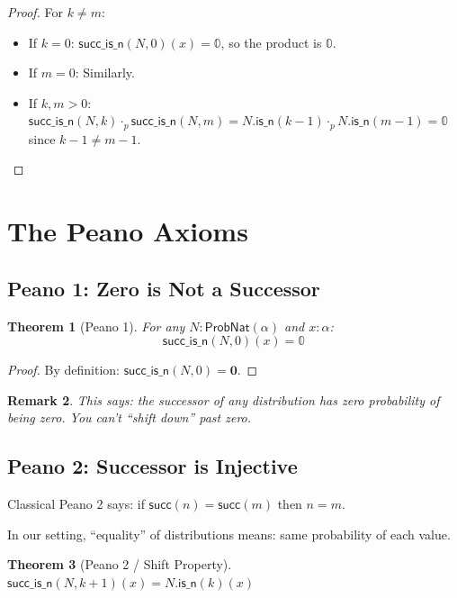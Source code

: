 \documentclass[11pt,a4paper]{article}
\newtheorem{theorem}{Theorem}[section]
\newtheorem{remark}[theorem]{Remark}
\newcommand{\ProbNat}{\mathsf{ProbNat}}
\newcommand{\pzero}{\mathbb{0}}
\newcommand{\pmul}{\cdot_p}
\begin{document}
\begin{proof}
For $k \neq m$:
\begin{itemize}
    \item If $k = 0$: $\mathsf{succ\_is\_n}(N, 0)(x) = \pzero$, so the product is $\pzero$.
    \item If $m = 0$: Similarly.
    \item If $k, m > 0$: $\mathsf{succ\_is\_n}(N, k) \pmul \mathsf{succ\_is\_n}(N, m) = N.\mathsf{is\_n}(k-1) \pmul N.\mathsf{is\_n}(m-1) = \pzero$ since $k-1 \neq m-1$.
\end{itemize}
\end{proof}

\section{The Peano Axioms}

\subsection{Peano 1: Zero is Not a Successor}

\begin{theorem}[Peano 1]
For any $N : \ProbNat(\alpha)$ and $x : \alpha$:
\[
\mathsf{succ\_is\_n}(N, 0)(x) = \pzero
\]
\end{theorem}

\begin{proof}
By definition: $\mathsf{succ\_is\_n}(N, 0) = \mathbf{0}$.
\end{proof}

\begin{remark}
This says: the successor of any distribution has zero probability of being zero. You can't ``shift down'' past zero.
\end{remark}

\subsection{Peano 2: Successor is Injective}

Classical Peano 2 says: if $\mathsf{succ}(n) = \mathsf{succ}(m)$ then $n = m$.

In our setting, ``equality'' of distributions means: same probability of each value.

\begin{theorem}[Peano 2 / Shift Property]
$\mathsf{succ\_is\_n}(N, k+1)(x) = N.\mathsf{is\_n}(k)(x)$
\end{theorem}
\end{document}
